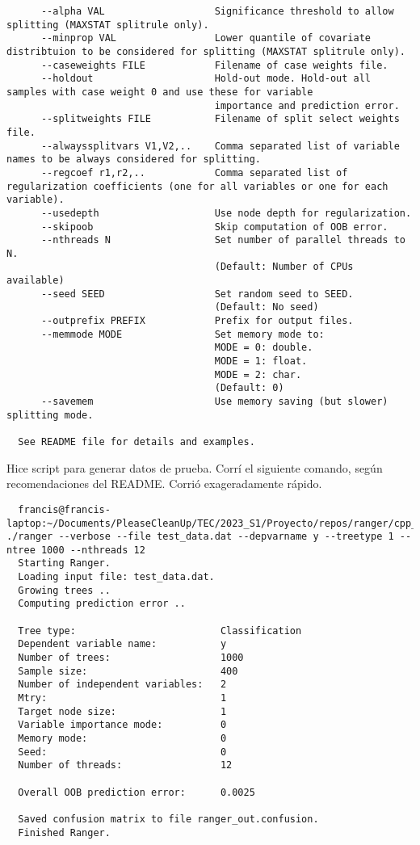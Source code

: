 \documentclass[12pt,oneside]{book}
\begin{document}
\begin{lstlisting}
      --alpha VAL                   Significance threshold to allow splitting (MAXSTAT splitrule only).
      --minprop VAL                 Lower quantile of covariate distribtuion to be considered for splitting (MAXSTAT splitrule only).
      --caseweights FILE            Filename of case weights file.
      --holdout                     Hold-out mode. Hold-out all samples with case weight 0 and use these for variable 
                                    importance and prediction error.
      --splitweights FILE           Filename of split select weights file.
      --alwayssplitvars V1,V2,..    Comma separated list of variable names to be always considered for splitting.
      --regcoef r1,r2,..            Comma separated list of regularization coefficients (one for all variables or one for each variable).
      --usedepth                    Use node depth for regularization.
      --skipoob                     Skip computation of OOB error.
      --nthreads N                  Set number of parallel threads to N.
                                    (Default: Number of CPUs available)
      --seed SEED                   Set random seed to SEED.
                                    (Default: No seed)
      --outprefix PREFIX            Prefix for output files.
      --memmode MODE                Set memory mode to:
                                    MODE = 0: double.
                                    MODE = 1: float.
                                    MODE = 2: char.
                                    (Default: 0)
      --savemem                     Use memory saving (but slower) splitting mode.
  
  See README file for details and examples.\end{lstlisting}

Hice script para generar datos de prueba. Corrí el siguiente comando, según recomendaciones del README. Corrió exageradamente rápido.

\begin{lstlisting}
  francis@francis-laptop:~/Documents/PleaseCleanUp/TEC/2023_S1/Proyecto/repos/ranger/cpp_version/build$ ./ranger --verbose --file test_data.dat --depvarname y --treetype 1 --ntree 1000 --nthreads 12
  Starting Ranger.
  Loading input file: test_data.dat.
  Growing trees ..
  Computing prediction error ..
  
  Tree type:                         Classification
  Dependent variable name:           y
  Number of trees:                   1000
  Sample size:                       400
  Number of independent variables:   2
  Mtry:                              1
  Target node size:                  1
  Variable importance mode:          0
  Memory mode:                       0
  Seed:                              0
  Number of threads:                 12
  
  Overall OOB prediction error:      0.0025
  
  Saved confusion matrix to file ranger_out.confusion.
  Finished Ranger. \end{lstlisting}
\end{document}
